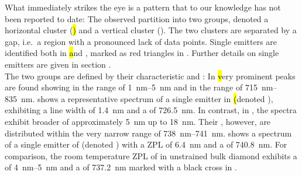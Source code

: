 	What immediately strikes the eye is a pattern that to our knowledge has not been reported to date:
	The observed \ZPLs partition into two groups, denoted a horizontal cluster (\hl) and a vertical cluster (\vl). The two clusters are separated by a gap, i.e.\ a region with a pronounced lack of data points.
	Single emitters are identified both in \hl and \vl, marked as red triangles in . Further details on single emitters are given in section .
	\\
	The two groups are defined by their characteristic \cwls and \lws:
	In \hl very prominent \ZPL peaks are found showing \lws in the range of \SIrange{1}{5}{nm} and \cwls in the range of \SIrange{715}{835}{nm}.
	 shows a representative spectrum of a single emitter in \hl (denoted \emnarrow), exhibiting a \ZPL line width of \SI{1.4}{nm} and a \cwl of \SI{726.5}{nm}.
	In contrast, in \vl, the spectra exhibit broader \ZPL \lws of approximately \SI{5}{nm} up to \SI{18}{nm}.
	Their \ZPL \cwls, however, are distributed within the very narrow range of \SIrange{738}{741}{nm}.
	 shows a spectrum of a single emitter of \vl (denoted \embroad) with a ZPL \lw of \SI{6.4}{nm} and a \cwl of \SI{740.8}{nm}.
	For comparison, the room temperature ZPL of \sivs in unstrained bulk diamond exhibits a \lw of \SIrange{4}{5}{nm} and a \cwl of \SI{737.2}{nm} marked with a black cross in  \cite{Arend2016a,Dietrich2014}.

